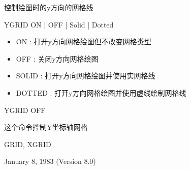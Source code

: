 \label{cmd:ygrid}

控制绘图时的y方向的网格线

YGRID ON | OFF | Solid | Dotted

\begin{itemize}
\item ON : 打开y方向网格绘图但不改变网格类型 
\item OFF : 关闭y方向网格绘图 
\item SOLID : 打开y方向网格绘图并使用实网格线 
\item DOTTED : 打开y方向网格绘图并使用虚线绘制网格线 
\end{itemize}

YGRID OFF

这个命令控制Y坐标轴网格

GRID, XGRID

January 8, 1983 (Version 8.0)

